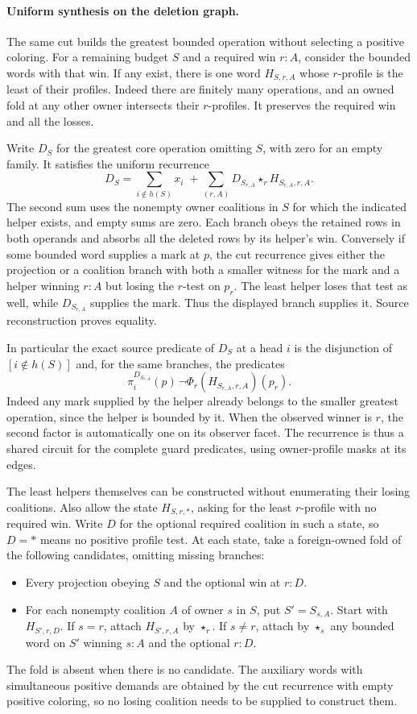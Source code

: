 \paragraph{Uniform synthesis on the deletion graph.}
The same cut builds the greatest bounded operation
without selecting a positive coloring. For a remaining
budget $S$ and a required win $r:A$, consider the
bounded words with that win. If any exist, there is
one word $H_{S,r,A}$ whose $r$-profile is the least
of their profiles. Indeed there are finitely many
operations, and an owned fold at any other owner
intersects their $r$-profiles. It preserves the required
win and all the losses.

Write $D_S$ for the greatest core operation omitting
$S$, with zero for an empty family. It satisfies the
uniform recurrence
\[
 D_S=
 \sum_{i\notin h(S)}x_i
 \; +\!
 \sum_{(r,A)}
    D_{S_{r,A}}\star_r H_{S_{r,A},r,A}.
\]
The second sum uses the nonempty owner coalitions
in $S$ for which the indicated helper exists, and
empty sums are zero. Each branch obeys the retained
rows in both operands and absorbs all the deleted
rows by its helper's win. Conversely if some bounded
word supplies a mark at $p$, the cut recurrence
gives either the projection or a coalition branch
with both a smaller witness for the mark and a
helper winning $r:A$ but losing the $r$-test on
$p_r$. The least helper loses that test as well,
while $D_{S_{r,A}}$ supplies the mark. Thus the
displayed branch supplies it. Source reconstruction
proves equality.

In particular the exact source predicate of $D_S$
at a head $i$ is the disjunction of $[i\notin h(S)]$
and, for the same branches, the predicates
\[
       \pi_i^{D_{S_{r,A}}}(p)\,
                 \neg\Phi_r(H_{S_{r,A},r,A})(p_r).
\]
Indeed any mark supplied by the helper already
belongs to the smaller greatest operation, since
the helper is bounded by it. When the observed
winner is $r$, the second factor is automatically
one on its observer facet. The recurrence is thus
a shared circuit for the complete guard predicates,
using owner-profile masks at its edges.

The least helpers themselves can be constructed
without enumerating their losing coalitions. Also
allow the state $H_{S,r,*}$, asking for the least
$r$-profile with no required win. Write $D$ for
the optional required coalition in such a state,
so $D=*$ means no positive profile test.
At each state, take a foreign-owned fold of the
following candidates, omitting missing branches:
\begin{itemize}
\item Every projection obeying $S$ and the
optional win at $r:D$.
\item For each nonempty coalition $A$ of owner
$s$ in $S$, put $S'=S_{s,A}$. Start with
$H_{S',r,D}$. If $s=r$, attach $H_{S',r,A}$
by $\star_r$. If $s\ne r$, attach by $\star_s$
any bounded word on $S'$ winning $s:A$ and
the optional $r:D$.
\end{itemize}
The fold is absent when there is no candidate.
The auxiliary words with simultaneous positive
demands are obtained by the cut recurrence with
empty positive coloring, so no losing coalition
needs to be supplied to construct them.

